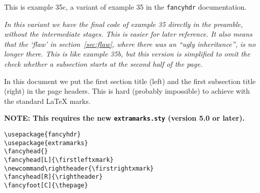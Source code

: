 \documentclass{article}
\newcommand\rightheader{\firstrightxmark}
\begin{document}
\pagestyle{intro}
\thispagestyle{contents}
\tableofcontents

\bigskip

\noindent
\begin{boxedminipage}{\textwidth}
This is example 35c, a variant of example 35 in the \texttt{fancyhdr} documentation.

{\em In this variant we have the final code of example 35 directly in the preamble, without the intermediate stages. This is easier for later reference. It also means that the `flaw' in section~\ref{sec:flaw}, where there was an ``ugly inheritance'', is no longer there. This is like example 35b, but this version is simplified to omit the check whether a subsection starts at the second half of the page.}

In this document we put the first section title (left) and the first subsection title (right) in the page headers. This is hard (probably impossible) to achieve with the standard \LaTeX{} marks.

\textbf{NOTE: This requires the new \texttt{extramarks.sty} (version 5.0 or later).}

\begin{verbatim}
\usepackage{fancyhdr}
\usepackage{extramarks}
\fancyhead{}
\fancyhead[L]{\firstleftxmark}
\newcommand\rightheader{\firstrightxmark}
\fancyhead[R]{\rightheader}
\fancyfoot[C]{\thepage}
\end{verbatim}
\end{boxedminipage}
\end{document}
